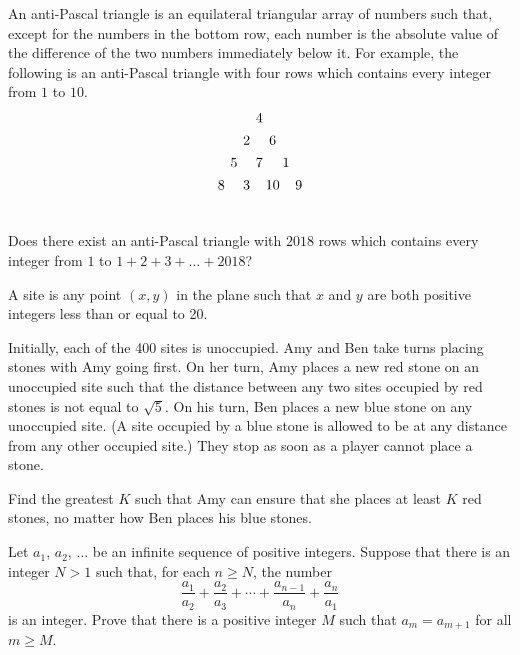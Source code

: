 \bq{}{}
An anti-Pascal triangle is an equilateral triangular array of numbers such that, except for the numbers in the 
bottom row, each number is the absolute value of the difference of the two numbers immediately below it. 
For example, the following is an anti-Pascal triangle with four rows which contains every integer from $1$ to $10$.
\[
\begin{array}{ c@{\hspace{4pt}}c@{\hspace{4pt}} c@{\hspace{4pt}}c@{\hspace{2pt}}c@{\hspace{2pt}}c@{\hspace{4pt}}c } 
  \vspace{4pt} & & & 4 & & & \\
  \vspace{4pt} & & 2 & & 6 & & \\
  \vspace{4pt} & 5 & & 7 & & 1 & \\
  \vspace{4pt} 8 & & 3 & & 10 & & 9 \\
  \vspace{4pt} 
\end{array}
\]
Does there exist an anti-Pascal triangle with $2018$ rows which contains every integer from $1$ to $1 + 2 + 3 + \dots + 2018$?
\eq

\bq{}{}
A site is any point $(x, y)$ in the plane such that $x$ and $y$ are both positive integers less than or equal to 20.

Initially, each of the 400 sites is unoccupied. Amy and Ben take turns placing stones with Amy going first. On her turn, Amy places 
a new red stone on an unoccupied site such that the distance between any two sites occupied by red stones is not equal to $\sqrt{5}$. 
On his turn, Ben places a new blue stone on any unoccupied site. (A site occupied by a blue stone is allowed to be at any distance 
from any other occupied site.) They stop as soon as a player cannot place a stone.

Find the greatest $K$ such that Amy can ensure that she places at least $K$ red stones, no matter how Ben places his blue stones.
\eq

\bq{}{}
Let $a_1$, $a_2$, $\ldots$ be an infinite sequence of positive integers. Suppose that there is an integer $N > 1$ such that, for each $n \geq N$, 
the number
$$\frac{a_1}{a_2} + \frac{a_2}{a_3} + \cdots + \frac{a_{n-1}}{a_n} + \frac{a_n}{a_1}$$
is an integer. Prove that there is a positive integer $M$ such that $a_m = a_{m+1}$ for all $m \geq M$.
\eq

